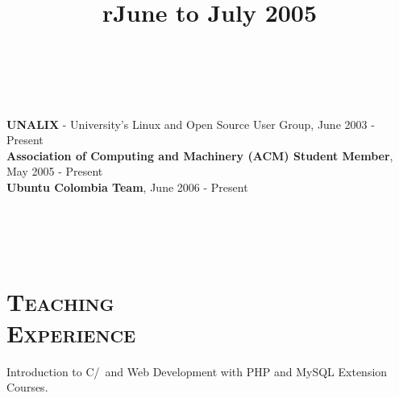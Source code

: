 \begin{resume}
\begin{formatb}
  \\
  \body\\
\end{formatb}
\employer{}
   {\textbf{UNALIX} - University's Linux and Open Source User Group, June 2003 - Present \\
    \textbf{Association of Computing and Machinery (ACM) Student Member}, May 2005 - Present \\
    \textbf{Ubuntu Colombia Team}, June 2006 - Present
     }



\begin{formatb}
  \title{r}\\
  \\
 \body\\
\end{formatb}

\section{\textsc{Teaching\\ Experience}}
\title{\textbf{June to July 2005}}
\begin{position}
Introduction to C/\Cplusplus\ and Web Development with PHP and MySQL Extension Courses.
\end{position}





\end{resume}
